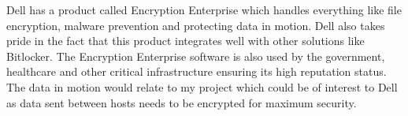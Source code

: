 Dell has a product called Encryption Enterprise \cite{Dell_Encryption_Enterprise} which handles everything like file encryption, malware prevention and protecting data in motion. Dell also takes pride in the fact that this product integrates well with other solutions like Bitlocker. The Encryption Enterprise software is also used by the government, healthcare and other critical infrastructure ensuring its high reputation status. The data in motion would relate to my project which could be of interest to Dell as data sent between hosts needs to be encrypted for maximum security. 
%
%
%
%